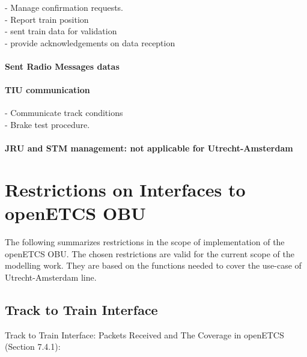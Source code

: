 \documentclass{template/openetcs_report}
\begin{document}
- Manage confirmation requests.\\
- Report train position\\
- sent train data for validation\\
- provide acknowledgements on data reception\\

\subsubsection{Sent Radio Messages datas}

\subsubsection{TIU communication}
- Communicate track conditions\\
- Brake test procedure.\\

\subsubsection{JRU and \gls{STM} management: not applicable for Utrecht-Amsterdam}

\newpage

 
\appendix{}

\chapter{Restrictions on Interfaces to openETCS OBU}
The following summarizes restrictions in the scope of implementation of the openETCS OBU. The chosen restrictions are valid for the current scope of the modelling work. They are based on the functions needed to cover the use-case of Utrecht-Amsterdam line.

\section{Track to Train Interface}

Track to Train Interface: Packets Received and The Coverage in openETCS (Section 7.4.1):
\end{document}
